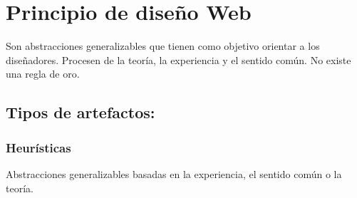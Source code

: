 \documentclass[12pt, twoside, openright]{report} %
\begin{document}
\section{Principio de diseño Web}


Son abstracciones generalizables que tienen como objetivo orientar a
los diseñadores. Procesen de la teoría, la experiencia y el sentido
común. No existe una regla de oro.

\subsection{Tipos de artefactos:}

\subsubsection{Heurísticas}
Abstracciones generalizables basadas en la
experiencia, el sentido común o la teoría.
\end{document}

